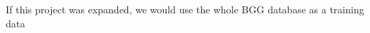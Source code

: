 \documentclass[a4paper,12pt,bibliography=totoc,numbers=noenddot,sfdefaults=false,abstract=true,notitlepage]{scrartcl} %
\begin{document}
	
	If this project was expanded, we would use the whole BGG database as a training data %
	
	
	\FloatBarrier
	\printbibliography
	
	
	
	

	
	
	\clearpage
	\setcounter{secnumdepth}{3} %
	\appendix %
	
	\renewcommand{\thefigure}{S\arabic{figure}}
	\setcounter{figure}{0}
	\renewcommand{\thetable}{S\arabic{table}}
	\setcounter{table}{0}
	
	\renewcommand{\thepage}{Appendix \Roman{page}} %
	
	\label{------APPENDIX------} %
	
	\FloatBarrier
	
	\clearpage
	
	
	
	
	
\end{document}
